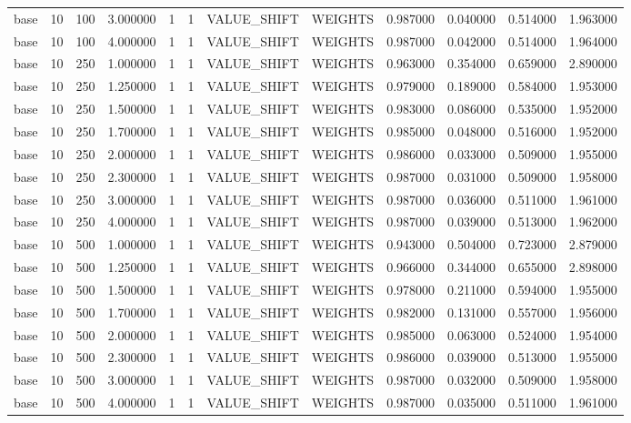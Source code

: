 \begin{tabular}{lrrrllllrrrr}
base & 10 & 100 & 3.000000 & 1 & 1 & VALUE_SHIFT & WEIGHTS & 0.987000 & 0.040000 & 0.514000 & 1.963000 \\
base & 10 & 100 & 4.000000 & 1 & 1 & VALUE_SHIFT & WEIGHTS & 0.987000 & 0.042000 & 0.514000 & 1.964000 \\
base & 10 & 250 & 1.000000 & 1 & 1 & VALUE_SHIFT & WEIGHTS & 0.963000 & 0.354000 & 0.659000 & 2.890000 \\
base & 10 & 250 & 1.250000 & 1 & 1 & VALUE_SHIFT & WEIGHTS & 0.979000 & 0.189000 & 0.584000 & 1.953000 \\
base & 10 & 250 & 1.500000 & 1 & 1 & VALUE_SHIFT & WEIGHTS & 0.983000 & 0.086000 & 0.535000 & 1.952000 \\
base & 10 & 250 & 1.700000 & 1 & 1 & VALUE_SHIFT & WEIGHTS & 0.985000 & 0.048000 & 0.516000 & 1.952000 \\
base & 10 & 250 & 2.000000 & 1 & 1 & VALUE_SHIFT & WEIGHTS & 0.986000 & 0.033000 & 0.509000 & 1.955000 \\
base & 10 & 250 & 2.300000 & 1 & 1 & VALUE_SHIFT & WEIGHTS & 0.987000 & 0.031000 & 0.509000 & 1.958000 \\
base & 10 & 250 & 3.000000 & 1 & 1 & VALUE_SHIFT & WEIGHTS & 0.987000 & 0.036000 & 0.511000 & 1.961000 \\
base & 10 & 250 & 4.000000 & 1 & 1 & VALUE_SHIFT & WEIGHTS & 0.987000 & 0.039000 & 0.513000 & 1.962000 \\
base & 10 & 500 & 1.000000 & 1 & 1 & VALUE_SHIFT & WEIGHTS & 0.943000 & 0.504000 & 0.723000 & 2.879000 \\
base & 10 & 500 & 1.250000 & 1 & 1 & VALUE_SHIFT & WEIGHTS & 0.966000 & 0.344000 & 0.655000 & 2.898000 \\
base & 10 & 500 & 1.500000 & 1 & 1 & VALUE_SHIFT & WEIGHTS & 0.978000 & 0.211000 & 0.594000 & 1.955000 \\
base & 10 & 500 & 1.700000 & 1 & 1 & VALUE_SHIFT & WEIGHTS & 0.982000 & 0.131000 & 0.557000 & 1.956000 \\
base & 10 & 500 & 2.000000 & 1 & 1 & VALUE_SHIFT & WEIGHTS & 0.985000 & 0.063000 & 0.524000 & 1.954000 \\
base & 10 & 500 & 2.300000 & 1 & 1 & VALUE_SHIFT & WEIGHTS & 0.986000 & 0.039000 & 0.513000 & 1.955000 \\
base & 10 & 500 & 3.000000 & 1 & 1 & VALUE_SHIFT & WEIGHTS & 0.987000 & 0.032000 & 0.509000 & 1.958000 \\
base & 10 & 500 & 4.000000 & 1 & 1 & VALUE_SHIFT & WEIGHTS & 0.987000 & 0.035000 & 0.511000 & 1.961000 \\

\end{tabular}
